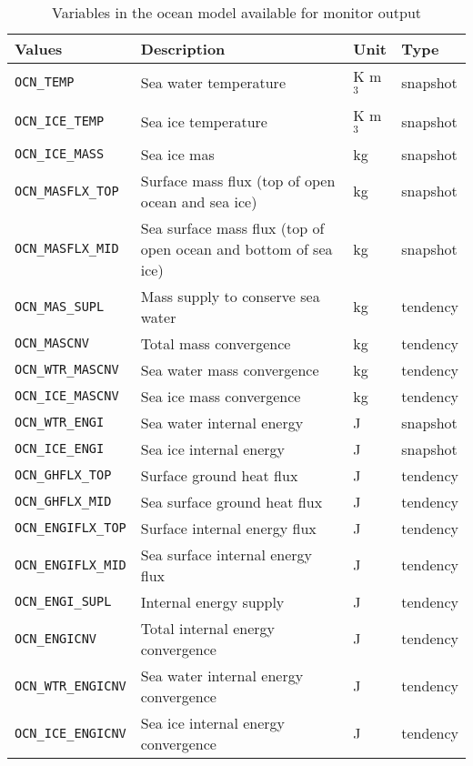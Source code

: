 \begin{table}[h]
\begin{center}
  \caption{Variables in the ocean model available for monitor output}
  \label{tab:varlist_monitor_ocean}
  \begin{tabularx}{150mm}{|l|X|l|l|} \hline
    \rowcolor[gray]{0.9}  Values & Description & Unit & Type \\ \hline
      \verb|OCN_TEMP|        & Sea water temperature                 & K m$^3$ & snapshot \\
      \verb|OCN_ICE_TEMP|    & Sea ice temperature                   & K m$^3$ & snapshot \\
      \verb|OCN_ICE_MASS|    & Sea ice mas                           & kg   & snapshot \\
      \verb|OCN_MASFLX_TOP|  & Surface mass flux (top of open ocean and sea ice)               & kg & snapshot \\
      \verb|OCN_MASFLX_MID|  & Sea surface mass flux (top of open ocean and bottom of sea ice) & kg & snapshot \\
      \verb|OCN_MAS_SUPL|    & Mass supply to conserve sea water     & kg   & tendency \\
      \verb|OCN_MASCNV|      & Total mass convergence                & kg   & tendency \\
      \verb|OCN_WTR_MASCNV|  & Sea water mass convergence            & kg   & tendency \\
      \verb|OCN_ICE_MASCNV|  & Sea ice mass convergence              & kg   & tendency \\
      \verb|OCN_WTR_ENGI|    & Sea water internal energy             & J    & snapshot \\
      \verb|OCN_ICE_ENGI|    & Sea ice internal energy               & J    & snapshot \\
      \verb|OCN_GHFLX_TOP|   & Surface ground heat flux              & J    & tendency \\
      \verb|OCN_GHFLX_MID|   & Sea surface ground heat flux          & J    & tendency \\
      \verb|OCN_ENGIFLX_TOP| & Surface internal energy flux          & J    & tendency \\
      \verb|OCN_ENGIFLX_MID| & Sea surface internal energy flux      & J    & tendency \\
      \verb|OCN_ENGI_SUPL|   & Internal energy supply                & J    & tendency \\
      \verb|OCN_ENGICNV|     & Total internal energy convergence     & J    & tendency \\
      \verb|OCN_WTR_ENGICNV| & Sea water internal energy convergence & J    & tendency \\
      \verb|OCN_ICE_ENGICNV| & Sea ice internal energy convergence   & J    & tendency \\
    \hline
  \end{tabularx}
\end{center}
\end{table}

